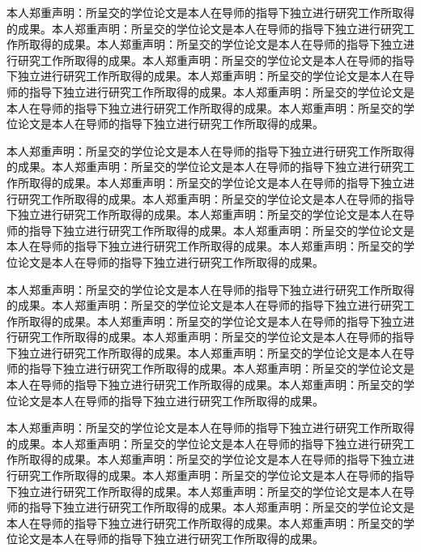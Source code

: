 \documentclass[class = professional, twoside,AutoFakeBold=3.17,AutoFakeSlant=0.2]{gdufe_master_thesis}
\begin{document}
本人郑重声明：所呈交的学位论文是本人在导师的指导下独立进行研究工作所取得的成果。本人郑重声明：所呈交的学位论文是本人在导师的指导下独立进行研究工作所取得的成果。本人郑重声明：所呈交的学位论文是本人在导师的指导下独立进行研究工作所取得的成果。本人郑重声明：所呈交的学位论文是本人在导师的指导下独立进行研究工作所取得的成果。本人郑重声明：所呈交的学位论文是本人在导师的指导下独立进行研究工作所取得的成果。本人郑重声明：所呈交的学位论文是本人在导师的指导下独立进行研究工作所取得的成果。本人郑重声明：所呈交的学位论文是本人在导师的指导下独立进行研究工作所取得的成果。
\the\baselineskip

 本人郑重声明：所呈交的学位论文是本人在导师的指导下独立进行研究工作所取得的成果。本人郑重声明：所呈交的学位论文是本人在导师的指导下独立进行研究工作所取得的成果。本人郑重声明：所呈交的学位论文是本人在导师的指导下独立进行研究工作所取得的成果。本人郑重声明：所呈交的学位论文是本人在导师的指导下独立进行研究工作所取得的成果。本人郑重声明：所呈交的学位论文是本人在导师的指导下独立进行研究工作所取得的成果。本人郑重声明：所呈交的学位论文是本人在导师的指导下独立进行研究工作所取得的成果。本人郑重声明：所呈交的学位论文是本人在导师的指导下独立进行研究工作所取得的成果。
\the\baselineskip

{ 本人郑重声明：所呈交的学位论文是本人在导师的指导下独立进行研究工作所取得的成果。本人郑重声明：所呈交的学位论文是本人在导师的指导下独立进行研究工作所取得的成果。本人郑重声明：所呈交的学位论文是本人在导师的指导下独立进行研究工作所取得的成果。本人郑重声明：所呈交的学位论文是本人在导师的指导下独立进行研究工作所取得的成果。本人郑重声明：所呈交的学位论文是本人在导师的指导下独立进行研究工作所取得的成果。本人郑重声明：所呈交的学位论文是本人在导师的指导下独立进行研究工作所取得的成果。本人郑重声明：所呈交的学位论文是本人在导师的指导下独立进行研究工作所取得的成果。
    \the\baselineskip}

本人郑重声明：所呈交的学位论文是本人在导师的指导下独立进行研究工作所取得的成果。本人郑重声明：所呈交的学位论文是本人在导师的指导下独立进行研究工作所取得的成果。本人郑重声明：所呈交的学位论文是本人在导师的指导下独立进行研究工作所取得的成果。本人郑重声明：所呈交的学位论文是本人在导师的指导下独立进行研究工作所取得的成果。本人郑重声明：所呈交的学位论文是本人在导师的指导下独立进行研究工作所取得的成果。本人郑重声明：所呈交的学位论文是本人在导师的指导下独立进行研究工作所取得的成果。本人郑重声明：所呈交的学位论文是本人在导师的指导下独立进行研究工作所取得的成果。
\the\baselineskip
\end{document}
